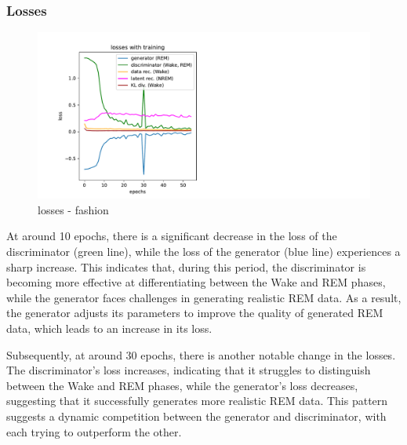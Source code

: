 \documentclass{midl} %
\begin{document}
\subsubsection{Losses}
\begin{figure}[H]
  \centering
  \includegraphics[width=1.2\textwidth]{losses_fashion.pdf}
  \caption{losses - fashion}
  \label{fig:losses - fashion}
\end{figure}
At around 10 epochs, there is a significant decrease in the loss of the discriminator (green line), while the loss of the generator (blue line) experiences a sharp increase. This indicates that, during this period, the discriminator is becoming more effective at differentiating between the Wake and REM phases, while the generator faces challenges in generating realistic REM data. As a result, the generator adjusts its parameters to improve the quality of generated REM data, which leads to an increase in its loss.

Subsequently, at around 30 epochs, there is another notable change in the losses. The discriminator's loss increases, indicating that it struggles to distinguish between the Wake and REM phases, while the generator's loss decreases, suggesting that it successfully generates more realistic REM data. This pattern suggests a dynamic competition between the generator and discriminator, with each trying to outperform the other.
\end{document}
